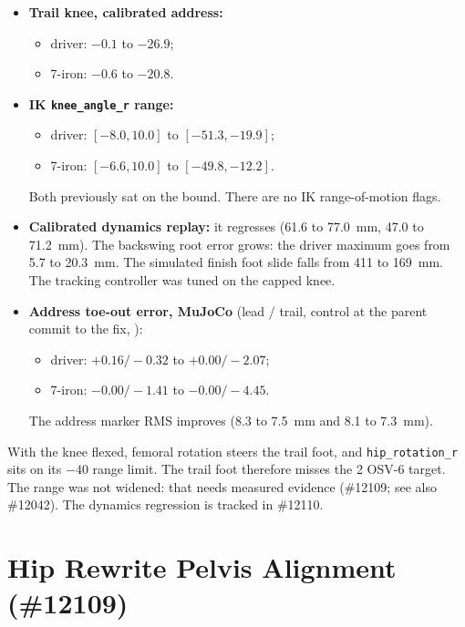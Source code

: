 \documentclass[11pt]{article}
\begin{document}
\begin{itemize}
\item \textbf{Trail knee, calibrated address:}
  \begin{itemize}
  \item driver: $-0.1$ to $-26.9$\textdegree;
  \item 7-iron: $-0.6$ to $-20.8$\textdegree.
  \end{itemize}
\item \textbf{IK \texttt{knee\_angle\_r} range:}
  \begin{itemize}
  \item driver: $[-8.0, 10.0]$ to $[-51.3, -19.9]$\textdegree;
  \item 7-iron: $[-6.6, 10.0]$ to $[-49.8, -12.2]$\textdegree.
  \end{itemize}
  Both previously sat on the bound. There are no IK range-of-motion flags.
\item \textbf{Calibrated dynamics replay:} it regresses (61.6 to 77.0~mm,
  47.0 to 71.2~mm). The backswing root error grows: the driver maximum goes
  from 5.7 to 20.3~mm. The simulated finish foot slide falls from 411 to
  169~mm. The tracking controller was tuned on the capped knee.
\item \textbf{Address toe-out error, MuJoCo} (lead / trail, control at the
  parent commit to the fix,
  ):
  \begin{itemize}
  \item driver: $+0.16/-0.32$ to $+0.00/-2.07$\textdegree;
  \item 7-iron: $-0.00/-1.41$ to $-0.00/-4.45$\textdegree.
  \end{itemize}
  The address marker RMS improves (8.3 to 7.5~mm and 8.1 to 7.3~mm).
\end{itemize}

With the knee flexed, femoral rotation steers the trail foot, and
\texttt{hip\_rotation\_r} sits on its $-40$\textdegree{} range limit. The trail
foot therefore misses the 2\textdegree{} OSV-6 target. The range was not
widened: that needs measured evidence (\#12109; see also \#12042). The
dynamics regression is tracked in \#12110.

\section{Hip Rewrite Pelvis Alignment (\#12109)}
\end{document}
